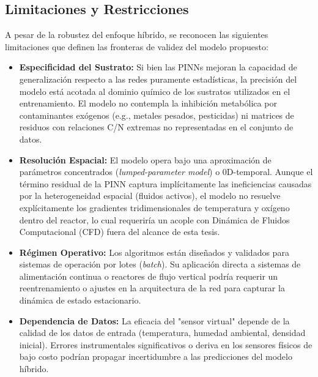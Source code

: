 \subsection{Limitaciones y Restricciones}
A pesar de la robustez del enfoque híbrido, se reconocen las siguientes limitaciones que definen las fronteras de validez del modelo propuesto:
\begin{itemize}
    \item \textbf{Especificidad del Sustrato:} Si bien las PINNs mejoran la capacidad de generalización respecto a las redes puramente estadísticas, la precisión del modelo está acotada al dominio químico de los sustratos utilizados en el entrenamiento. El modelo no contempla la inhibición metabólica por contaminantes exógenos (e.g., metales pesados, pesticidas) ni matrices de residuos con relaciones C/N extremas no representadas en el conjunto de datos.
    \item \textbf{Resolución Espacial:} El modelo opera bajo una aproximación de parámetros concentrados (\textit{lumped-parameter model}) o 0D-temporal. Aunque el término residual de la PINN captura implícitamente las ineficiencias causadas por la heterogeneidad espacial (fluidos activos), el modelo no resuelve explícitamente los gradientes tridimensionales de temperatura y oxígeno dentro del reactor, lo cual requeriría un acople con Dinámica de Fluidos Computacional (CFD) fuera del alcance de esta tesis.
    \item \textbf{Régimen Operativo:} Los algoritmos están diseñados y validados para sistemas de operación por lotes (\textit{batch}). Su aplicación directa a sistemas de alimentación continua o reactores de flujo vertical podría requerir un reentrenamiento o ajustes en la arquitectura de la red para capturar la dinámica de estado estacionario.
    \item \textbf{Dependencia de Datos:} La eficacia del "sensor virtual" depende de la calidad de los datos de entrada (temperatura, humedad ambiental, densidad inicial). Errores instrumentales significativos o deriva en los sensores físicos de bajo costo podrían propagar incertidumbre a las predicciones del modelo híbrido.
\end{itemize}
